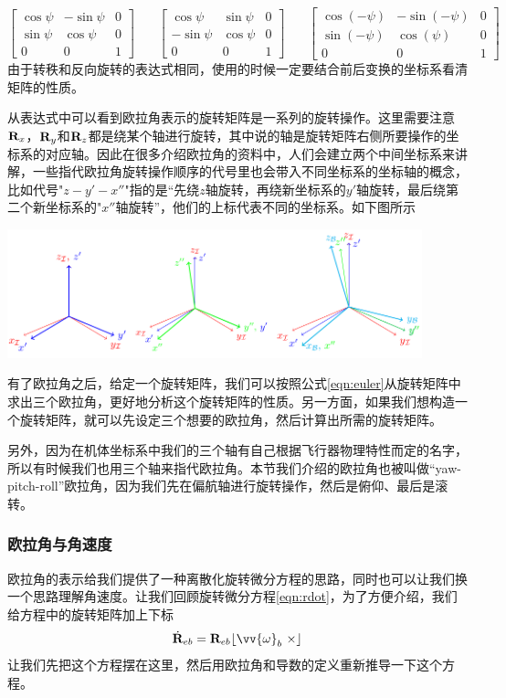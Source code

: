 \documentclass[11pt]{article}
\begin{document}
$$
\begin{bmatrix}
\cos\psi & - \sin\psi & 0\\
\sin\psi & \cos\psi & 0\\
0 & 0 & 1
\end{bmatrix}
\ \ \ \  \ \ \ \
\begin{bmatrix}
\cos\psi & \sin\psi & 0\\
-\sin\psi & \cos\psi & 0\\
0 & 0 & 1
\end{bmatrix} 
\ \ \ \  \ \ \ \
\begin{bmatrix}
\cos(-\psi) & -\sin(-\psi) & 0\\
\sin(-\psi) & \cos(\psi) & 0\\
0 & 0 & 1
\end{bmatrix} 
$$
由于转秩和反向旋转的表达式相同，使用的时候一定要结合前后变换的坐标系看清矩阵的性质。

从表达式中可以看到欧拉角表示的旋转矩阵是一系列的旋转操作。这里需要注意${\bf R}_x$，${\bf R}_y$和${\bf R}_z$都是绕某个轴进行旋转，其中说的轴是旋转矩阵右侧所要操作的坐标系的对应轴。因此在很多介绍欧拉角的资料中，人们会建立两个中间坐标系来讲解，一些指代欧拉角旋转操作顺序的代号里也会带入不同坐标系的坐标轴的概念，比如代号"$z-y'-x''$"指的是“先绕$z$轴旋转，再绕新坐标系的$y'$轴旋转，最后绕第二个新坐标系的"$x''$轴旋转”，他们的上标代表不同的坐标系。如下图所示

\begin{center}
\includegraphics[width=0.9\textwidth]{images/euler.png}
\end{center}

有了欧拉角之后，给定一个旋转矩阵，我们可以按照公式\ref{eqn:euler}从旋转矩阵中求出三个欧拉角，更好地分析这个旋转矩阵的性质。另一方面，如果我们想构造一个旋转矩阵，就可以先设定三个想要的欧拉角，然后计算出所需的旋转矩阵。

另外，因为在机体坐标系中我们的三个轴有自己根据飞行器物理特性而定的名字，所以有时候我们也用三个轴来指代欧拉角。本节我们介绍的欧拉角也被叫做“yaw-pitch-roll”欧拉角，因为我们先在偏航轴进行旋转操作，然后是俯仰、最后是滚转。

\subsubsection{欧拉角与角速度}\label{sec:eulerandangular}
欧拉角的表示给我们提供了一种离散化旋转微分方程的思路，同时也可以让我们换一个思路理解角速度。让我们回顾旋转微分方程\ref{eqn:rdot}，为了方便介绍，我们给方程中的旋转矩阵加上下标
$$
\dot{{\bf R}}_{eb} = {\bf R}_{eb}\lfloor \vv{\omega}_b \ \times \rfloor
$$
让我们先把这个方程摆在这里，然后用欧拉角和导数的定义重新推导一下这个方程。
\end{document}
